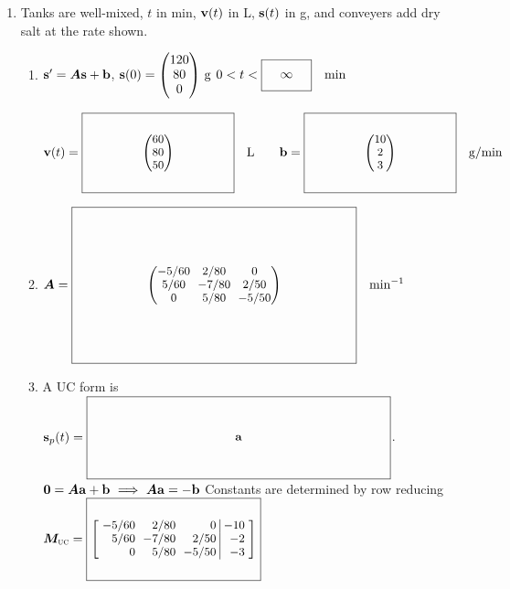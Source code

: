 \documentclass[11pt,letterpaper]{article}
\newcommand{\mat}[1]{\bm{#1}}
\newcommand{\TimeBlank}[1][]{%
  \vcenter{\hbox{$\boxed{\parbox[c][0.25in][c]{0.45in}{\centering\ensuremath{#1}}}$}}}
\newcommand{\KeyBox}[3]{%
  \vcenter{\hbox{$\boxed{\parbox[c][#2][c]{#1}{\centering\small
    \setlength{\arraycolsep}{3pt}\renewcommand{\arraystretch}{0.95}%
    \ensuremath{\displaystyle #3}}}$}}}
\begin{document}
\begin{enumerate}
\setlength{\parskip}{3pt}
\item \mbox{}
\newline
{}
\newline
Tanks are well-mixed, $t$ in min, $\mathbf{v}(t)$ in L, $\mathbf{s}(t)$ in g, and conveyers add dry salt at the rate shown. 
\begin{enumerate}
\item
$\vect{s}'=\mat{A}\vect{s}+\vect{b}$,
$\vect{s}(0)=\begin{pmatrix}120\\80\\0\end{pmatrix}\,\mathrm{g}$\quad
$0<t<\TimeBlank[\infty]\quad\mathrm{min}$

\noindent $\vect{v}(t)=\KeyBox{1.6in}{0.80in}{\begin{pmatrix}60\\80\\50\end{pmatrix}}\quad\mathrm{L}\qquad
\vect{b}=\KeyBox{1.6in}{0.80in}{\begin{pmatrix}10\\2\\3\end{pmatrix}}\quad\mathrm{g/min}$
\item $\mat{A}=\KeyBox{3.0in}{1.60in}{\begin{pmatrix}- 5/60&2/80&0\\5/60&- 7/80&2/50\\0&5/80&- 5/50\end{pmatrix}}\quad\mathrm{min}^{-1}$
\item A UC form is $\vect{s}_p(t)=\KeyBox{3.2in}{0.80in}{\vect{a}}$. 
\hfill{\footnotesize $\vect{0}=\mat{A}\vect{a}+\vect{b}\ \Longrightarrow\ \mat{A}\vect{a}=-\vect{b}$}
Constants are determined by row reducing
$\mat{M}_{\text{\textsc{uc}}}=\KeyBox{1.8in}{0.80in}{\left[\begin{array}{rrr|r}- 5/60&2/80&0&-10\\5/60&- 7/80&2/50&-2\\0&5/80&- 5/50&-3\end{array}\right]}$


\end{enumerate}
\end{enumerate}
\end{document}
